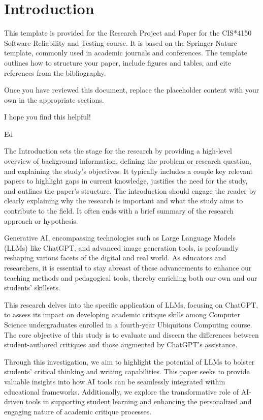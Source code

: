 \section{Introduction}
\label{Introduction}

This template is provided for the Research Project and Paper for the CIS*4150 Software Reliability and Testing course. It is based on the Springer Nature template, commonly used in academic journals and conferences. The template outlines how to structure your paper, include figures and tables, and cite references from the bibliography.

Once you have reviewed this document, replace the placeholder content with your own in the appropriate sections.

I hope you find this helpful!

Ed

The Introduction sets the stage for the research by providing a high-level overview of background information, defining the problem or research question, and explaining the study's objectives. It typically includes a couple key relevant papers to highlight gaps in current knowledge, justifies the need for the study, and outlines the paper's structure. The introduction should engage the reader by clearly explaining why the research is important and what the study aims to contribute to the field. It often ends with a brief summary of the research approach or hypothesis.


Generative AI, encompassing technologies such as Large Language Models (LLMs) like ChatGPT, and advanced image generation tools, is profoundly reshaping various facets of the digital and real world. As educators and researchers, it is essential to stay abreast of these advancements to enhance our teaching methods and pedagogical tools, thereby enriching both our own and our students' skillsets.

This research delves into the specific application of LLMs, focusing on ChatGPT, to assess its impact on developing academic critique skills among Computer Science undergraduates enrolled in a fourth-year Ubiquitous Computing course. The core objective of this study is to evaluate and discern the differences between student-authored critiques and those augmented by ChatGPT's assistance.

Through this investigation, we aim to highlight the potential of LLMs to bolster students' critical thinking and writing capabilities. This paper seeks to provide valuable insights into how AI tools can be seamlessly integrated within educational frameworks.  Additionally, we explore the transformative role of AI-driven tools in supporting student learning and enhancing the personalized and engaging nature of academic critique processes.

